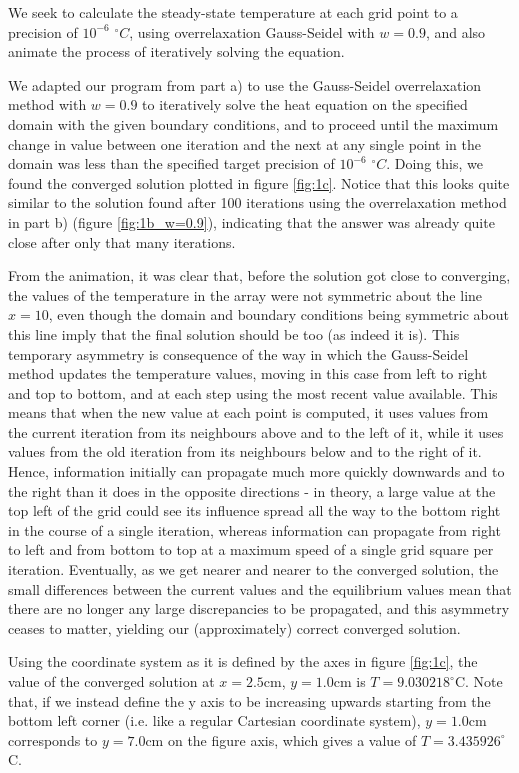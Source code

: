 \documentclass{article}
\begin{document}
We seek to calculate the steady-state temperature at each grid point to a precision of $10^{-6}$ $^\circ C$, using overrelaxation Gauss-Seidel with $w=0.9$, and also animate the process of iteratively solving the equation.

We adapted our program from part a) to use the Gauss-Seidel overrelaxation method with $w=0.9$ to iteratively solve the heat equation on the specified domain with the given boundary conditions, and to proceed until the maximum change in value between one iteration and the next at any single point in the domain was less than the specified target precision of $10^{-6}$ $^\circ C$. Doing this, we found the converged solution plotted in figure \ref{fig:1c}. Notice that this looks quite similar to the solution found after 100 iterations using the overrelaxation method in part b) (figure \ref{fig:1b_w=0.9}), indicating that the answer was already quite close after only that many iterations.

From the animation, it was clear that, before the solution got close to converging, the values of the temperature in the array were not symmetric about the line $x=10$, even though the domain and boundary conditions being symmetric about this line imply that the final solution should be too (as indeed it is). This temporary asymmetry is consequence of the way in which the Gauss-Seidel method updates the temperature values, moving in this case from left to right and top to bottom, and at each step using the most recent value available. This means that when the new value at each point is computed, it uses values from the current iteration from its neighbours above and to the left of it, while it uses values from the old iteration from its neighbours below and to the right of it. Hence, information initially can propagate much more quickly downwards and to the right than it does in the opposite directions - in theory, a large value at the top left of the grid could see its influence spread all the way to the bottom right in the course of a single iteration, whereas information can propagate from right to left and from bottom to top at a maximum speed of a single grid square per iteration. Eventually, as we get nearer and nearer to the converged solution, the small differences between the current values and the equilibrium values mean that there are no longer any large discrepancies to be propagated, and this asymmetry ceases to matter, yielding our (approximately) correct converged solution.

Using the coordinate system as it is defined by the axes in figure \ref{fig:1c}, the value of the converged solution at $x=2.5$cm, $y=1.0$cm is $T = 9.030218 ^\circ$C. Note that, if we instead define the y axis to be increasing upwards starting from the bottom left corner (i.e. like a regular Cartesian coordinate system), $y=1.0$cm corresponds to $y=7.0$cm on the figure axis, which gives a value of $T = 3.435926 ^\circ$C.
\end{document}
